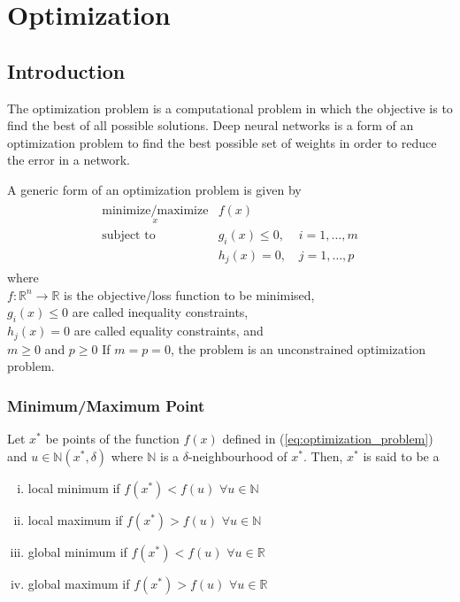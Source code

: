 \chapter{Optimization}
\section{Introduction}
The optimization problem is a computational problem in which the objective is to find the best of all possible solutions. Deep neural networks is a form of an optimization problem to find the best possible set of weights in order to reduce the error in a network.

\noindent A generic form of an optimization problem is given by 
\begin{align}
  \begin{matrix}
    \underset{x}{\text{minimize/maximize}} &f(x) & \\
    \text{subject to} &g_i(x) \leq 0, \, \, & i=1,\dots,m \\
    &h_j(x) = 0, & j=1,\dots,p
  \end{matrix}
  \label{eq:optimization_problem}
\end{align} 
\noindent where \\
\indent $f: \mathbb{R}^n \rightarrow \mathbb{R}$ is the objective/loss function to be minimised,\\
\indent $g_i(x) \leq 0$ are called inequality constraints,\\
\indent $h_j(x) = 0$ are called equality constraints, and \\
\indent $m\geq0$ and $p\geq0$
\noindent If $m=p=0$, the problem is an unconstrained optimization problem.
\subsection*{Minimum/Maximum Point}
Let $x^*$  be points of the function $f(x)$ defined in (\ref{eq:optimization_problem}) and $u \in \mathbb{N}(x^*,\delta)$ where $\mathbb{N}$ is a $\delta$-neighbourhood of $x^*$. Then, $x^*$ is said to be a
\begin{enumerate}[(i)]
    \item local minimum if $f(x^*) < f(u)$    $\forall u\in\mathbb{N}$
    \item local  maximum if $f(x^*) > f(u)$ $\forall u\in\mathbb{N}$
    \item global minimum if $f(x^*) < f(u)$ $\forall u\in\mathbb{R}$
    \item global maximum if $f(x^*) > f(u)$ $\forall u\in\mathbb{R}$
\end{enumerate}

